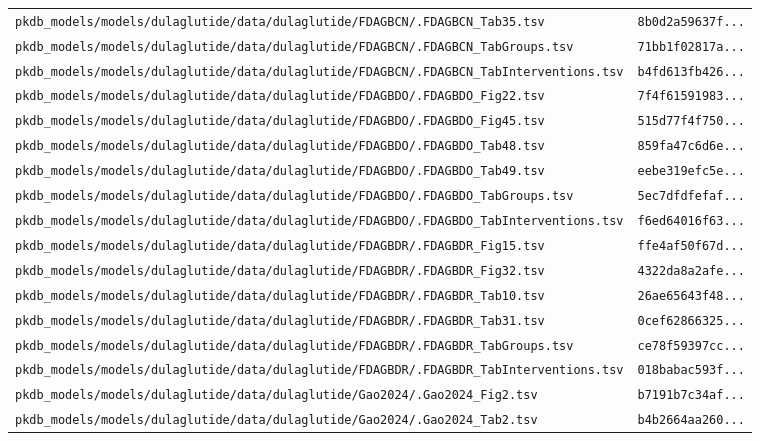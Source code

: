 \begin{longtable}{ll}
\texttt{pkdb\_models/models/dulaglutide/data/dulaglutide/FDAGBCN/.FDAGBCN\_Tab35.tsv} & \texttt{8b0d2a59637f...} \\
\texttt{pkdb\_models/models/dulaglutide/data/dulaglutide/FDAGBCN/.FDAGBCN\_TabGroups.tsv} & \texttt{71bb1f02817a...} \\
\texttt{pkdb\_models/models/dulaglutide/data/dulaglutide/FDAGBCN/.FDAGBCN\_TabInterventions.tsv} & \texttt{b4fd613fb426...} \\
\texttt{pkdb\_models/models/dulaglutide/data/dulaglutide/FDAGBDO/.FDAGBDO\_Fig22.tsv} & \texttt{7f4f61591983...} \\
\texttt{pkdb\_models/models/dulaglutide/data/dulaglutide/FDAGBDO/.FDAGBDO\_Fig45.tsv} & \texttt{515d77f4f750...} \\
\texttt{pkdb\_models/models/dulaglutide/data/dulaglutide/FDAGBDO/.FDAGBDO\_Tab48.tsv} & \texttt{859fa47c6d6e...} \\
\texttt{pkdb\_models/models/dulaglutide/data/dulaglutide/FDAGBDO/.FDAGBDO\_Tab49.tsv} & \texttt{eebe319efc5e...} \\
\texttt{pkdb\_models/models/dulaglutide/data/dulaglutide/FDAGBDO/.FDAGBDO\_TabGroups.tsv} & \texttt{5ec7dfdfefaf...} \\
\texttt{pkdb\_models/models/dulaglutide/data/dulaglutide/FDAGBDO/.FDAGBDO\_TabInterventions.tsv} & \texttt{f6ed64016f63...} \\
\texttt{pkdb\_models/models/dulaglutide/data/dulaglutide/FDAGBDR/.FDAGBDR\_Fig15.tsv} & \texttt{ffe4af50f67d...} \\
\texttt{pkdb\_models/models/dulaglutide/data/dulaglutide/FDAGBDR/.FDAGBDR\_Fig32.tsv} & \texttt{4322da8a2afe...} \\
\texttt{pkdb\_models/models/dulaglutide/data/dulaglutide/FDAGBDR/.FDAGBDR\_Tab10.tsv} & \texttt{26ae65643f48...} \\
\texttt{pkdb\_models/models/dulaglutide/data/dulaglutide/FDAGBDR/.FDAGBDR\_Tab31.tsv} & \texttt{0cef62866325...} \\
\texttt{pkdb\_models/models/dulaglutide/data/dulaglutide/FDAGBDR/.FDAGBDR\_TabGroups.tsv} & \texttt{ce78f59397cc...} \\
\texttt{pkdb\_models/models/dulaglutide/data/dulaglutide/FDAGBDR/.FDAGBDR\_TabInterventions.tsv} & \texttt{018babac593f...} \\
\texttt{pkdb\_models/models/dulaglutide/data/dulaglutide/Gao2024/.Gao2024\_Fig2.tsv} & \texttt{b7191b7c34af...} \\
\texttt{pkdb\_models/models/dulaglutide/data/dulaglutide/Gao2024/.Gao2024\_Tab2.tsv} & \texttt{b4b2664aa260...} \\

\end{longtable}
